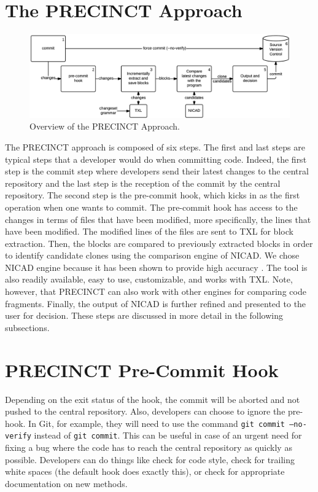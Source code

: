 \section{The PRECINCT Approach}
\label{sec:The PRECINCT Approach}

\begin{figure}
  \centering
    \includegraphics[width=\textwidth]{media/approach.png}
    \caption{ Overview of the PRECINCT Approach.\label{fig:precinct-approach}}
\end{figure}

The PRECINCT approach is composed of six steps.
The first and last steps are typical steps that a developer would do when committing code.
Indeed, the first step is the commit step where developers send their latest changes to the central repository and the last step is the reception of the commit by the central repository.
The second step is the pre-commit hook, which kicks in as the first operation when one wants to commit.
The pre-commit hook has access to the changes in terms of files that have been modified, more specifically, the lines that have been modified. The modified lines of the files are sent to TXL\cite{Cordy2006a} for block extraction. Then, the blocks are compared to previously extracted blocks in order to identify candidate clones using the comparison engine of NICAD\cite{Cordy2011}. We chose NICAD engine because it has been shown to provide high accuracy \cite{Cordy2011}. The tool is also readily available, easy to use, customizable, and works with TXL. Note, however, that PRECINCT can also work with other engines for comparing code fragments.
Finally, the output of NICAD is further refined and presented to the user for decision.
These steps are discussed in more detail in the following subsections.

\section{PRECINCT Pre-Commit Hook}
\label{sub:Pre-Commit Hook}

Depending on the exit status of the hook, the commit will be aborted and not pushed to the central repository.
Also, developers can choose to ignore the pre-hook. In Git, for example, they will need to use the command \texttt{git commit --no-verify} instead of \texttt{git commit}.
This can be useful in case of an urgent need for fixing a bug where the code has to reach the central repository as quickly as possible.
Developers can do things like check for code style, check for trailing white spaces (the default hook does exactly this), or check for appropriate documentation on new methods.

